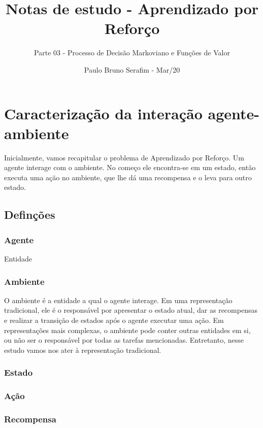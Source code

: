 \documentclass{article}
\title{Notas de estudo - Aprendizado por Reforço}
\author{Parte 03 - Processo de Decisão Markoviano e Funções de Valor}
\date{Paulo Bruno Serafim - Mar/20}
\begin{document}
\maketitle

    \section{Caracterização da interação agente-ambiente}
    
        Inicialmente, vamos recapitular o problema de Aprendizado por Reforço. Um agente interage com o ambiente. No começo ele encontra-se em um estado, então executa uma ação no ambiente, que lhe dá uma recompensa e o leva para outro estado. 
    
        \subsection{Definções}
            
            \subsubsection{Agente}
            
                Entidade 
            
            \subsubsection{Ambiente}
            
                O ambiente é a entidade a qual o agente interage. Em uma representação tradicional, ele é o responsável por apresentar o estado atual, dar as recompensas e realizar a transição de estados após o agente executar uma ação. Em representações mais complexas, o ambiente pode conter outras entidades em si, ou não ser o responsável por todas as tarefas mencionadas. Entretanto, nesse estudo vamos nos ater à representação tradicional.
            
            \subsubsection{Estado}
            \subsubsection{Ação}
            \subsubsection{Recompensa}
            
\end{document}
